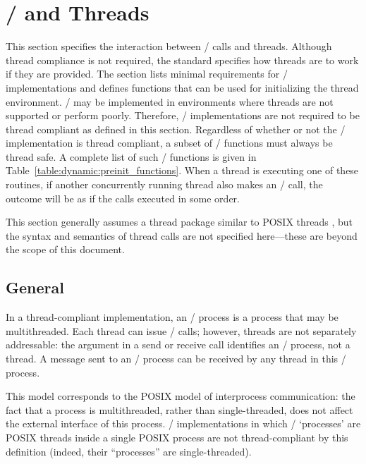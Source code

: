 \section{\texorpdfstring{\MPI/}{MPI} and Threads}
\label{sec:dynamic:threads}
\label{sec:ei-threads}

This section specifies the interaction between \MPI/ calls and threads.
Although thread compliance is not required,
the standard specifies how threads are to work if they are provided.
The section lists minimal requirements for
  \MPI/ implementations
and defines functions that can
be used for initializing the thread environment.
\MPI/ may be implemented in environments where threads
are not supported or perform poorly.  Therefore, \MPI/ implementations are not required to be thread compliant as defined in this section.
Regardless of whether or not the \MPI/ implementation is thread compliant,
a subset of \MPI/ functions must always be thread safe.
A complete list of such \MPI/ functions is given in Table~\ref{table:dynamic:preinit_functions}. When a
thread is executing one of these routines, if another concurrently
running thread also makes an \MPI/ call, the outcome will be as if the
calls executed in some order.


This section
generally assumes a thread package similar to
POSIX threads \cite{posix-1003.1}, but the
syntax and semantics of thread calls are not specified here---these
are beyond the scope of this document.

\subsection{General}

In a thread-compliant implementation, an \MPI/ process is a process
that may be multithreaded.
Each thread can issue \MPI/ calls; however, threads are not
separately addressable: the  argument in a send or receive call identifies an
\MPI/ process, not a thread.  A message sent to an \MPI/ process can be received by
any thread in this \MPI/ process.

\begin{rationale}
This model corresponds to the POSIX model of interprocess
communication: the fact that a process is multithreaded, rather than
single-threaded, does not affect the external interface of this
process.
\MPI/ implementations in which \MPI/ `processes' are POSIX threads
inside a single POSIX process are not thread-compliant by this
definition (indeed, their ``processes'' are single-threaded).
\end{rationale}

